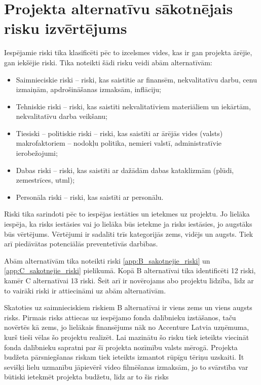 \section{Projekta alternatīvu sākotnējais risku izvērtējums}
Iespējamie riski tika klasificēti pēc to izcelsmes vides, kas ir gan projekta ārējie, gan
iekšējie riski. Tika noteikti šādi risku veidi abām alternatīvām:
\cite{PMBOK}
\begin{itemize}
    \item Saimnieciskie riski – riski, kas saistītie ar finansēm, nekvalitatīvu darbu,
cenu izmaiņām, apdrošināšanas izmaksām, inflāciju;
    \item Tehniskie riski – riski, kas saistīti nekvalitatīviem materiāliem un iekārtām, nekvalitatīvu
darba veikšanu;
    \item Tiesiski – politiskie riski – riski, kas saistīti ar ārējās vides (valsts) makrofaktoriem –
nodokļu politika, nemieri valstī, administratīvie ierobežojumi;
    \item Dabas riski – riski, kas saistīti ar dažādām dabas kataklizmām (plūdi, zemestrīces, utml);
    \item Personāla riski – riski, kas saistīti ar personālu.
\end{itemize}
Riski tika sarindoti pēc to iespējas iestāties un ietekmes uz projektu. Jo lielāka iespēja,
ka risks iestāsies vai jo lielāka būs ietekme ja risks iestāsies, jo augstāks būs vērtējums.
Vērtējumi ir sadalīti trīs kategorijās zems, vidējs un augsts. Tiek arī piedāvātas potenciālās
preventetīvās darbības.
\par
Abām alternatīvām tika noteikti riski \ref{app:B_sakotnejie_riski} un \ref{app:C_sakotnejie_riski} pielikumā.
Kopā B alternatīvai tika identificēti 12 riski, kamēr C alternatīvai 13 riski. Šeit arī ir novērojams 
abo projektu līdzība, līdz ar to vairāki riski ir attiecināmi uz abām alternatīvām.
\par 
Skatoties uz saimnieciskiem riskiem B alternatīvai ir viens zems un viens augsts risks. Pirmais risks attiecas
uz iespējamo fonda dalībnieku izstāšanos, taču novērtēs kā zems, jo lielākais finansējums nāk no
Accenture Latvia uzņēmuma, kurš tieši vēlas šo projektu realizēt. Lai mazinātu šo risku tiek ieteikts
viecināt fonda dalībnieku sapratni par šī projekta nozīmību valsts mērogā. Projekta budžeta pārsniegšanas
riskam tiek ieteikts izmantot rūpīgu tēriņu uzskaiti. It sevišķi lielu uzmanību jāpievērš video
filmēšanas izmaksām, jo to svārstība var būtiski ietekmēt projekta budžetu, līdz ar to šis risks

